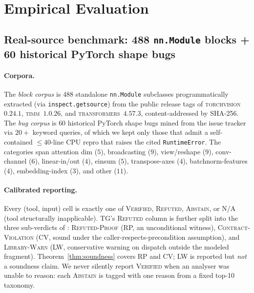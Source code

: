 \section{Empirical Evaluation}\label{sec:eval}

\subsection{Real-source benchmark: 488 \texttt{nn.Module} blocks
 + 60 historical PyTorch shape bugs}
\label{sec:eval-benchmark}

\paragraph{Corpora.}
The \emph{block corpus} is $488$ standalone \texttt{nn.Module}
subclasses programmatically extracted (via
\texttt{inspect.getsource}) from the public release tags of
\textsc{torchvision}~$0.24.1$, \textsc{timm}~$1.0.26$, and
\textsc{transformers}~$4.57.3$, content-addressed by SHA-256.
The \emph{bug corpus} is $60$ historical PyTorch shape bugs
mined from the issue tracker via
$20{+}$ keyword queries, of which we kept only those that
admit a self-contained $\le 40$-line CPU repro that raises the
cited \texttt{RuntimeError}. The categories span attention dim
($5$), broadcasting ($9$), view/reshape ($9$),
conv-channel ($6$), linear-in/out ($4$), einsum ($5$),
transpose-axes ($4$), batchnorm-features ($4$), embedding-index
($3$), and other ($11$).

\paragraph{Calibrated reporting.} Every (tool, input) cell is
exactly one of \textsc{Verified}, \textsc{Refuted},
\textsc{Abstain}, or \textsc{N/A} (tool structurally
inapplicable). \textsc{TG}'s \textsc{Refuted} column is further
split into the three sub-verdicts of :
\textsc{Refuted-Proof} (RP, an unconditional witness),
\textsc{Contract-Violation} (CV, sound under the caller-respects-precondition
assumption), and \textsc{Library-Warn} (LW, conservative warning
on dispatch outside the modeled fragment). Theorem~\ref{thm:soundness}
covers RP and CV; LW is reported but \emph{not} a soundness claim.
We never silently report \textsc{Verified} when an analyser was
unable to reason: each \textsc{Abstain} is tagged with one
reason from a fixed top-10 taxonomy.

